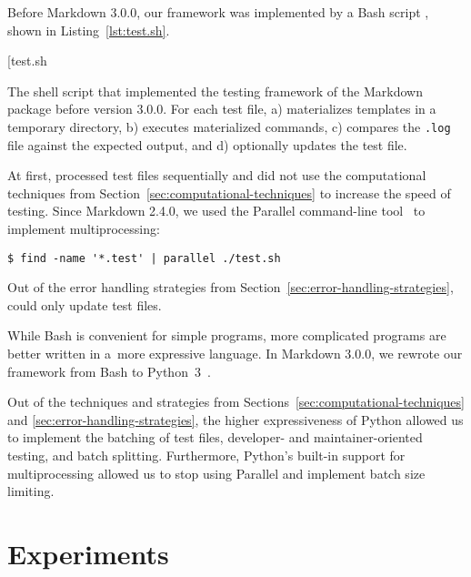 \documentclass[final]{ltugboat}
\makeatletter
\newenvironment{listing*}{\@dblfloat{listing}}{\end@dblfloat}
\newcounter{listing}
\makeatother
\begin{document}
Before Markdown 3.0.0, our framework was implemented by a Bash script , shown in Listing~\ref{lst:test.sh}.

\begin{listing*}
\bigExample*[{test.sh}
\caption{The shell script  that implemented the testing framework of the Markdown package before version 3.0.0. For each test file,  a) materializes templates in a temporary directory, b) executes materialized commands, c) compares the \texttt{.log} file against the expected output, and d) optionally updates the test file.}
\label{lst:test.sh}
\vspace{-2pt} %
\end{listing*}

At first,  processed test files sequentially and did not use the computational techniques from Section~\ref{sec:computational-techniques} to increase the speed of testing. Since Markdown 2.4.0, we used the  Parallel command-line tool~\cite{tange2011gnu} to implement multiprocessing:
\begin{verbatim}
$ find -name '*.test' | parallel ./test.sh
\end{verbatim}
Out of the error handling strategies from Section~\ref{sec:error-handling-strategies},  could only update test files.

While Bash is convenient for simple programs, more complicated programs are better written in a~more expressive language. In Markdown 3.0.0, we rewrote our framework from Bash to Python~3~\cite{novotny2023implement}.

Out of the techniques and strategies from Sections~\ref{sec:computational-techniques} and \ref{sec:error-handling-strategies}, the higher expressiveness of Python allowed us to implement the batching of test files, developer- and maintainer-oriented testing, and batch splitting. Furthermore, Python's built-in support for multiprocessing allowed us to stop using  Parallel and implement batch size limiting.

\section{Experiments}
\label{sec:experiments}
\end{document}
